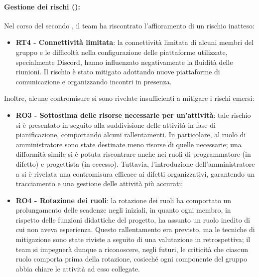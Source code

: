 \paragraph*{Gestione dei rischi ():}
\par Nel corso del secondo , il team ha riscontrato l'affioramento di un rischio inatteso:
\begin{itemize}
  \item \textbf{RT4 - Connettività limitata}: la connettività limitata di alcuni membri del gruppo e le difficoltà nella configurazione delle piattaforme utilizzate, specialmente Discord, hanno influenzato negativamente la fluidità delle riunioni. Il rischio è stato mitigato adottando nuove piattaforme di comunicazione e organizzando incontri in presenza.
\end{itemize}

\par Inoltre, alcune contromisure si sono rivelate insufficienti a mitigare i rischi emersi:
\begin{itemize}
  \item \textbf{RO3 - Sottostima delle risorse necessarie per un'attività}: tale rischio si è presentato in seguito alla suddivisione delle attività in fase di pianificazione, comportando alcuni rallentamenti. In particolare, al ruolo di amministratore sono state destinate meno risorse di quelle necessarie; una difformità simile si è potuta riscontrare anche nei ruoli di programmatore (in difetto) e progettista (in eccesso). Tuttavia, l'introduzione dell'amministratore a  si è rivelata una contromisura efficace ai difetti organizzativi, garantendo un tracciamento e una gestione delle attività più accurati;
  \item \textbf{RO4 - Rotazione dei ruoli}: la rotazione dei ruoli ha comportato un prolungamento delle scadenze negli  iniziali, in quanto ogni membro, in rispetto delle funzioni didattiche del progetto, ha assunto un ruolo inedito di cui non aveva esperienza. Questo rallentamento era previsto, ma le tecniche di mitigazione sono state riviste a seguito di una valutazione in retrospettiva; il team si impegnerà dunque a riconoscere, negli  futuri, le criticità che ciascun ruolo comporta prima della rotazione, cosicché ogni componente del gruppo abbia chiare le attività ad esso collegate.
\end{itemize}

